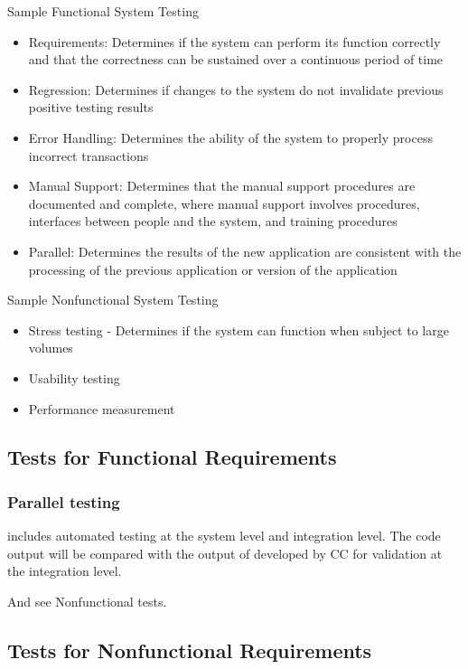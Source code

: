 \documentclass[12pt, titlepage]{article}
\begin{document}
Sample Functional System Testing
\begin{itemize}
\item Requirements: Determines if the system can perform its function correctly and that the correctness can be sustained over a continuous period of time
\item Regression: Determines if changes to the system do not invalidate previous positive testing results
\item Error Handling: Determines the ability of the system to properly process
  incorrect transactions
\item Manual Support: Determines that the manual support procedures are documented and complete, where manual support involves procedures, interfaces between people and the system, and training procedures
\item Parallel: Determines the results of the new application are consistent with the processing of the previous application or version of the application
\end{itemize}

Sample Nonfunctional System Testing
\begin{itemize}
\item Stress testing - Determines if the system can function when subject to large volumes
\item Usability testing
\item Performance measurement
\end{itemize}

\subsection{Tests for Functional Requirements}

\subsubsection{Parallel testing}

 includes automated testing at the system level
and integration level. The code output
will be compared with the output of \rdcon developed by CC for validation at the integration level.

And see Nonfunctional tests.

\subsection{Tests for Nonfunctional Requirements}
\end{document}
